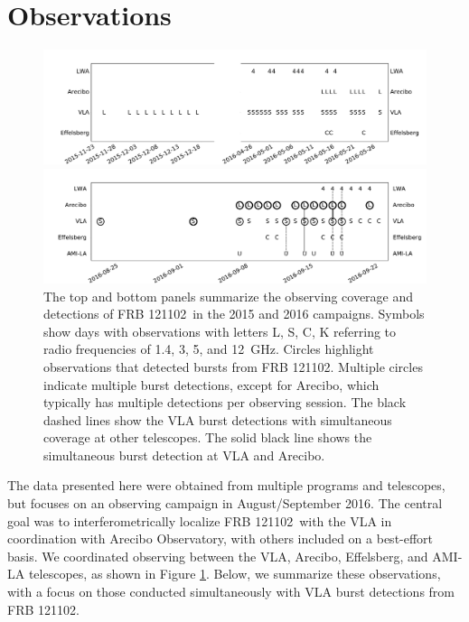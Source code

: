 \documentclass[twocolumn]{aastex61}
\newcommand{\frb}{FRB 121102}
\begin{document}
\section{Observations}

\begin{figure}[t]
\begin{center}
\includegraphics[width=2\columnwidth]{timeline0}

\includegraphics[width=2\columnwidth]{timeline}
\caption{The top and bottom panels summarize the observing coverage and detections of \frb\ in the 2015 and 2016 campaigns. Symbols show days with observations with letters L, S, C, K referring to radio frequencies of 1.4, 3, 5, and 12~GHz. Circles highlight observations that detected bursts from \frb. Multiple circles indicate multiple burst detections, except for Arecibo, which typically has multiple detections per observing session. The black dashed lines show the VLA burst detections with simultaneous coverage at other telescopes. The solid black line shows the simultaneous burst detection at VLA and Arecibo.
\label{fig:multi}}
\end{center}
\end{figure}

The data presented here were obtained from multiple programs and telescopes, but focuses on an observing campaign in August/September 2016. The central goal was to interferometrically localize \frb\ with the VLA in coordination with Arecibo Observatory, with others included on a best-effort basis. We coordinated observing between the VLA, Arecibo, Effelsberg, and AMI-LA telescopes, as shown in Figure \ref{fig:multi}. Below, we summarize these observations, with a focus on those conducted simultaneously with VLA burst detections from \frb.
\end{document}
